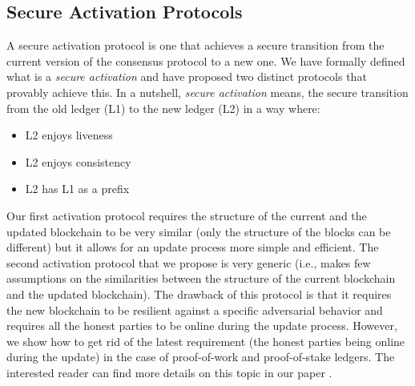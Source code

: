 \subsection{Secure Activation Protocols}\label{sec:secure_activation_protocols}
A secure activation protocol is one that achieves a secure transition from the 
current version of the consensus protocol to a new one. We have formally 
defined what is a \emph{secure activation} and have proposed two distinct 
protocols that provably achieve this. In a
nutshell, \emph{secure activation} means, the secure transition from the old
ledger (L1) to the new ledger (L2) in a way where:
\begin{itemize}
	\item L2 enjoys liveness \cite{backbone}
	\item L2 enjoys consistency \cite{backbone}
	\item L2 has L1 as a prefix
\end{itemize}

Our first activation protocol requires the structure of the current and the 
updated blockchain to be very similar (only the structure of the blocks can be 
different) but it allows for an update process more simple and efficient. The 
second activation protocol that we propose is very generic (i.e., makes few 
assumptions on the similarities between the structure of the current blockchain 
and the updated blockchain). The drawback of this protocol is that it requires 
the new blockchain to be resilient against a specific adversarial behavior and
requires all the honest parties to be online during the update process.
However, we show how to get rid of the latest requirement (the honest
parties being online during the update) in the case of proof-of-work and
proof-of-stake ledgers. The interested reader can find more details on this 
topic in our paper \cite{secure_activation}.